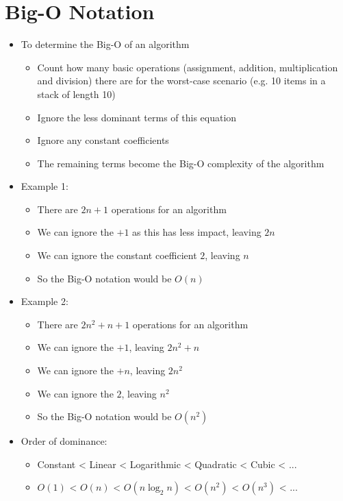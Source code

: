 \section*{Big-O Notation}

\begin{itemize}
  \item To determine the Big-O of an algorithm
  \begin{itemize}
    \item Count how many basic operations (assignment, addition, multiplication and division) there are for the worst-case scenario (e.g. 10 items in a stack of length 10)
    \item Ignore the less dominant terms of this equation
    \item Ignore any constant coefficients
    \item The remaining terms become the Big-O complexity of the algorithm
  \end{itemize}
  \item Example 1:
  \begin{itemize}
    \item There are $2n + 1$ operations for an algorithm
    \item We can ignore the $+ 1$ as this has less impact, leaving $2n$
    \item We can ignore the constant coefficient $2$, leaving $n$
    \item So the Big-O notation would be $O(n)$
  \end{itemize}
  \item Example 2:
  \begin{itemize}
    \item There are $2n^2 + n + 1$ operations for an algorithm
    \item We can ignore the $+ 1$, leaving $2n^2 + n$
    \item We can ignore the $+ n$, leaving $2n^2$
    \item We can ignore the $2$, leaving $n^2$
    \item So the Big-O notation would be $O(n^2)$
  \end{itemize}
  \item Order of dominance:
  \begin{itemize}
    \item Constant < Linear < Logarithmic < Quadratic < Cubic < ...
    \item $O(1)$ < $O(n)$ < $O(n\log_2 n)$ < $O(n^2)$ < $O(n^3)$ < ...
  \end{itemize}
\end{itemize}